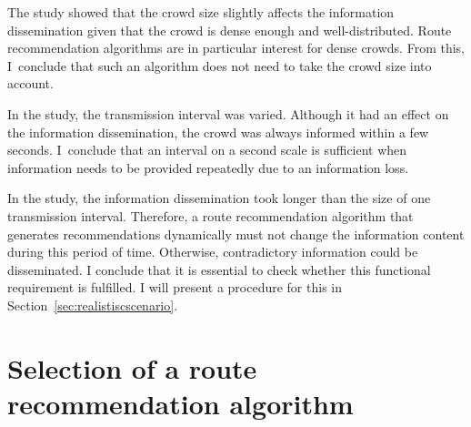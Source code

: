 The study showed that the crowd size slightly affects the information dissemination given that the crowd is dense enough and well-distributed. Route recommendation algorithms are in particular interest for dense crowds. From this, I~conclude that such an algorithm does not need to take the crowd size into account.

In the study, the transmission interval was varied. Although it had an effect on the information dissemination, the crowd was always informed within a few seconds. I~conclude that an interval on a second scale is sufficient when information needs to be provided repeatedly due to an information loss.

In the study, the information dissemination took longer than the size of one transmission interval. Therefore, a route recommendation algorithm that generates recommendations dynamically must not change the information content during this period of time. Otherwise, contradictory information could be disseminated. I conclude that it is essential to check whether this functional requirement is fulfilled. I will present a procedure for this in Section~\ref{sec:realistiscscenario}.









\section{Selection of a route recommendation algorithm}

\label{sec:umleitalgorithmen}

